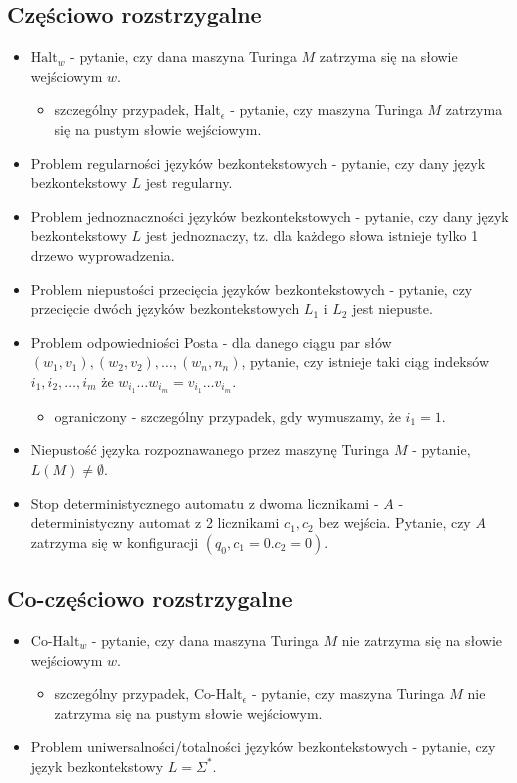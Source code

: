 \documentclass{article}
\theoremstyle{definition}
\theoremstyle{remark}
\begin{document}
\subsection{Częściowo rozstrzygalne}
\begin{itemize}
    \item $\text{Halt}_w$ - pytanie, czy dana maszyna Turinga $M$ zatrzyma się na słowie wejściowym $w$. 
    \begin{itemize}
    \item szczególny przypadek, $\text{Halt}_{\epsilon}$ - pytanie, czy maszyna Turinga $M$ zatrzyma się na pustym słowie wejściowym.
    \end{itemize}
    \item Problem regularności języków bezkontekstowych - pytanie, czy dany język bezkontekstowy $L$ jest regularny.
    \item Problem jednoznaczności języków bezkontekstowych - pytanie, czy dany język bezkontekstowy $L$ jest jednoznaczy, tz. dla każdego słowa istnieje tylko 1 drzewo wyprowadzenia.
    \item Problem niepustości przecięcia języków bezkontekstowych - pytanie, czy przecięcie dwóch języków bezkontekstowych $L_1$ i $L_2$ jest niepuste.
    \item Problem odpowiedniości Posta - dla danego ciągu par słów $(w_1, v_1), (w_2, v_2), \ldots, (w_n, n_n)$, pytanie, czy istnieje taki ciąg indeksów $i_1, i_2, \ldots, i_m$ że $ w_{i_1} \ldots w_{i_m} = v_{i_1} \ldots v_{i_m}$.
    \begin{itemize}
        \item ograniczony - szczególny przypadek, gdy wymuszamy, że $i_1=1$.
    \end{itemize}
    \item Niepustość języka rozpoznawanego przez maszynę Turinga $M$ - pytanie, $L(M) \neq \emptyset$.
    \item Stop deterministycznego automatu z dwoma licznikami - $A$ - deterministyczny automat z 2 licznikami $c_1, c_2$ bez wejścia. Pytanie, czy $A$ zatrzyma się w konfiguracji $(q_0, c_1 = 0. c_2=0)$.
\end{itemize}

\subsection{Co-częściowo rozstrzygalne}
\begin{itemize}
    \item $\text{Co-Halt}_w$ - pytanie, czy dana maszyna Turinga $M$ nie zatrzyma się na słowie wejściowym $w$.
    \begin{itemize}
        \item szczególny przypadek, $\text{Co-Halt}_{\epsilon}$ - pytanie, czy maszyna Turinga $M$ nie zatrzyma się na pustym słowie wejściowym.
    \end{itemize}
    \item Problem uniwersalności/totalności języków bezkontekstowych - pytanie, czy język bezkontekstowy $L = \Sigma^*$.
\end{itemize}
\end{document}

